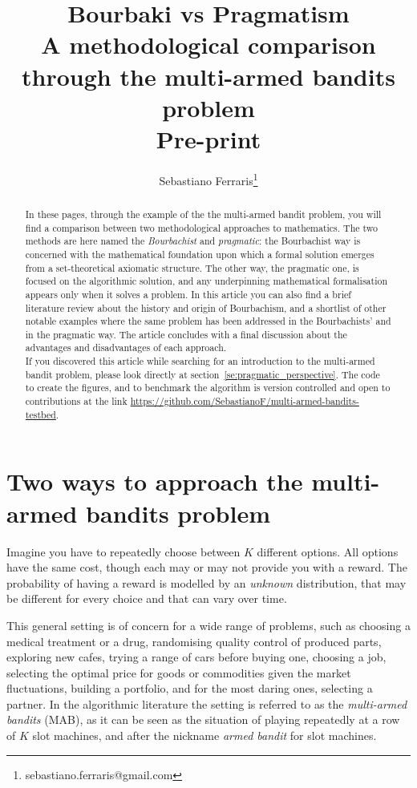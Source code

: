 \documentclass[]{scrartcl}
\title{Bourbaki vs Pragmatism \\ A methodological comparison through the multi-armed bandits problem
 \\
Pre-print
}
\author{Sebastiano Ferraris\footnote{sebastiano.ferraris@gmail.com}}
\theoremstyle{definition}
\begin{document}
\maketitle

\begin{abstract}
    In these pages, through the example of the the multi-armed bandit problem, you will find a comparison between two methodological approaches to mathematics.
    The two methods are here named the \emph{Bourbachist} and \emph{pragmatic}: the Bourbachist way is concerned with the mathematical foundation upon which a formal solution emerges from a set-theoretical axiomatic structure. The other way, the pragmatic one, is focused on the algorithmic solution, and any underpinning mathematical formalisation appears only when it solves a problem.
    In this article you can also find a brief literature review about the history and origin of Bourbachism, and a shortlist of other notable examples where the same problem has been addressed in the Bourbachists' and in the pragmatic way. The article concludes with a final discussion about the advantages and disadvantages of each approach. \\

\noindent
If you discovered this article while searching for an introduction to the multi-armed bandit problem, please look directly at section~\ref{se:pragmatic_perspective}. The code to create the figures, and to benchmark the algorithm is version controlled and open to contributions at the link \href{https://github.com/SebastianoF/multi-armed-bandits-testbed}{https://github.com/SebastianoF/multi-armed-bandits-testbed}.
\end{abstract}


\section{Two ways to approach the multi-armed bandits problem}
\label{se:intro}
Imagine you have to repeatedly choose between $K$ different options. All options have the same cost, though each may or may not provide you with a reward. The probability of having a reward is modelled by an \emph{unknown} distribution, that may be different for every choice and that can vary over time.

This general setting is of concern for a wide range of problems, such as choosing a medical treatment or a drug, randomising quality control of produced parts, exploring new cafes, trying a range of cars before buying one, choosing a job, selecting the optimal price for goods or commodities given the market fluctuations, building a portfolio, and for the most daring ones, selecting a partner. In the algorithmic literature the setting is referred to as the \emph{multi-armed bandits} (MAB), as it can be seen as the situation of playing repeatedly at a row of $K$ slot machines, and after the nickname \emph{armed bandit} for slot machines.
\end{document}
